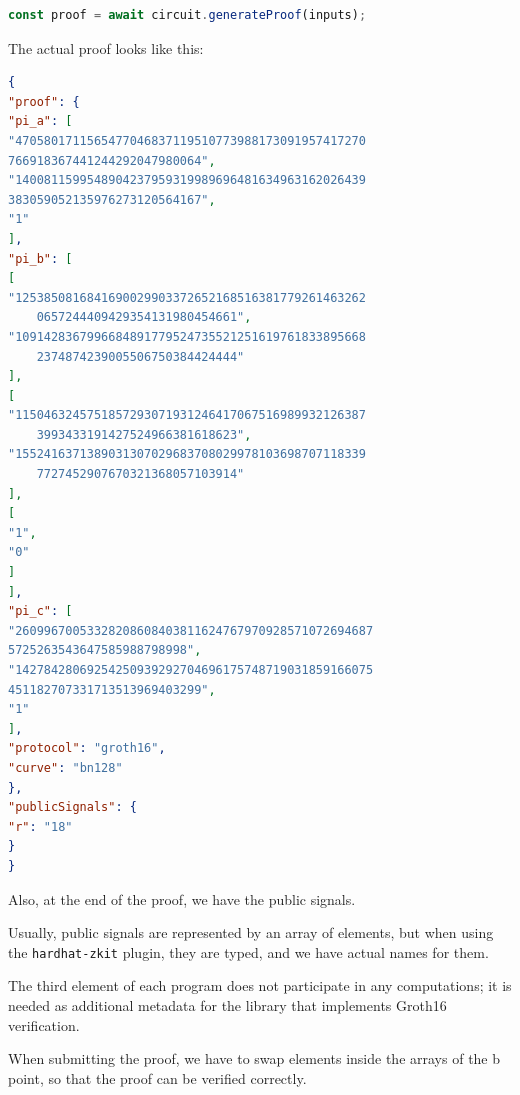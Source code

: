 \documentclass[../lecture-notes-148x210.tex]{subfiles}
\begin{document}
\begin{lstlisting}[language=TypeScript,numbers=none]
const proof = await circuit.generateProof(inputs);
\end{lstlisting}

The actual proof looks like this:
\begin{center}
    \begin{tcolorbox}[enhanced,
        width=0.925\textwidth,
        title=\textbf{proof.json},
        coltitle=gray!25!black,
        attach boxed title to top center={yshift=-2mm,yshifttext=-1mm},
        boxed title style={size=small,colframe=gray!75!black,
        colback=purple!30!white,boxrule=1pt},
        top=-0.35cm,
        bottom=-0.35cm]
        \begin{lstlisting}[language=JSON,numbers=none,basicstyle=\ttfamily\scriptsize]
{
"proof": {
"pi_a": [
"4705801711565477046837119510773988173091957417270
766918367441244292047980064",
"1400811599548904237959319989696481634963162026439
383059052135976273120564167",
"1"
],
"pi_b": [
[
"1253850816841690029903372652168516381779261463262
    0657244409429354131980454661",
"1091428367996684891779524735521251619761833895668
    2374874239005506750384424444"
],
[
"1150463245751857293071931246417067516989932126387
    3993433191427524966381618623",
"1552416371389031307029683708029978103698707118339
    7727452907670321368057103914"
],
[
"1",
"0"
]
],
"pi_c": [
"26099670053328208608403811624767970928571072694687
5725263543647585988798998",
"14278428069254250939292704696175748719031859166075
451182707331713513969403299",
"1"
],
"protocol": "groth16",
"curve": "bn128"
},
"publicSignals": {
"r": "18"
}
}
        \end{lstlisting}
    \end{tcolorbox}
\end{center}

Also, at the end of the proof, we have the public signals.

\begin{remark}
    Usually, public signals are represented by an array of elements, but when using the \texttt{hardhat-zkit} plugin,
    they are typed, and we have actual names for them.
\end{remark}

The third element of each program does not participate in any computations; it is needed as additional metadata for the library that implements Groth16 verification.

\begin{remark}
    When submitting the proof, we have to swap elements inside the arrays of the b point, so that the proof can be verified correctly.
\end{remark}
\end{document}
